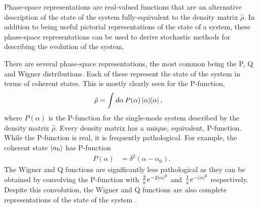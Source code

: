 
Phase-space representations are real-valued functions that are an alternative description of the state of the system fully-equivalent to the density matrix $\hat{\rho}$.  In addition to being useful pictorial representations of the state of a system, these phase-space representations can be used to derive stochastic methods for describing the evolution of the system.

There are several phase-space representations, the most common being the P, Q and Wigner distributions.  Each of these represent the state of the system in terms of coherent states.  This is mostly clearly seen for the P-function,
\begin{align}
    \hat{\rho} &= \int d \alpha\, P(\alpha) \ketbra{\alpha}{\alpha}, \label{BackgroundTheory:PFunction}
\end{align}
where $P(\alpha)$ is the P-function for the single-mode system described by the density matrix $\hat{\rho}$.  Every density matrix has a unique, equivalent, P-function.  While the P-function is real, it is frequently pathological.  For example, the coherent state ${\left|\alpha_0\right>}$ has P-function
\begin{align}
    P(\alpha) &= \delta^2(\alpha - \alpha_0).
\end{align}
The Wigner and Q functions are significantly less pathological as they can be obtained by convolving the P-function with $\frac{2}{\pi}e^{-2 \left|\alpha\right|^2}$ and $\frac{1}{\pi} e^{-\left|\alpha\right|^2}$ respectively.  Despite this convolution, the Wigner and Q functions are also complete representations of the state of the system \citep{GardinerQN}.

